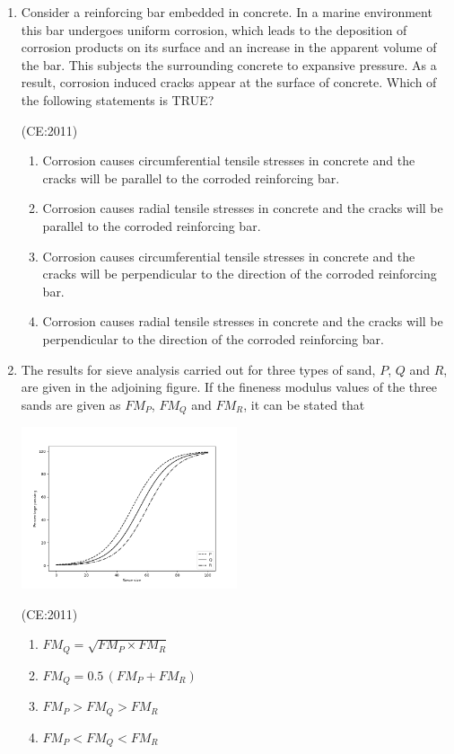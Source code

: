 \documentclass[journal,12pt,onecolumn]{IEEEtran}
\theoremstyle{remark}
\begin{document}
\begin{enumerate}
\item 
	Consider a reinforcing bar embedded in concrete. In a marine environment this bar undergoes uniform corrosion, which leads to the deposition of corrosion products on its surface and an increase in the apparent volume of the bar. This subjects the surrounding concrete to expansive pressure. As a result, corrosion induced cracks appear at the surface of concrete. Which of the following statements is TRUE? 

	\hfill (CE:2011)
        \begin{enumerate}
            \item Corrosion causes circumferential tensile stresses in concrete and the cracks will be parallel to the corroded reinforcing bar.
            \item Corrosion causes radial tensile stresses in concrete and the cracks will be parallel to the corroded reinforcing bar.
            \item Corrosion causes circumferential tensile stresses in concrete and the cracks will be perpendicular to the direction of the corroded reinforcing bar.
            \item Corrosion causes radial tensile stresses in concrete and the cracks will be perpendicular to the direction of the corroded reinforcing bar.
        \end{enumerate}

    \item 
	    The results for sieve analysis carried out for three types of sand, $P$, $Q$ and $R$, are given in the adjoining figure. If the fineness modulus values of the three sands are given as $FM_P$, $FM_Q$ and $FM_R$, it can be stated that

	    \begin{center}
    \includegraphics[width=0.5\textwidth]{figs/graph.png}
\end{center}
	    \hfill (CE:2011)
    \begin{multicols}{2}
        \begin{enumerate}
            \item \(FM_Q = \sqrt{FM_P \times FM_R}\)
            \item \(FM_Q = 0.5 \, (FM_P + FM_R)\)
            \item \(FM_P > FM_Q > FM_R\)
            \item \(FM_P < FM_Q < FM_R\)
        \end{enumerate}
    \end{multicols}
    

\end{enumerate}
\end{document}
